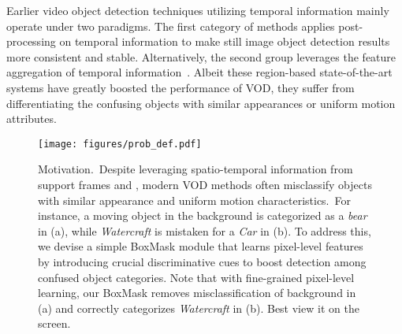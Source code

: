 \documentclass[10pt,twocolumn,letterpaper]{article}
\begin{document}
Earlier video object detection techniques utilizing temporal information mainly operate under two paradigms. The first category of methods applies post-processing on temporal information to make still image object detection results~\cite{han2016seq, kang2016object, kang2017t, belhassen2019improving} more consistent and stable. Alternatively, the second group leverages the feature aggregation of temporal information~\cite{zhu2017flow, chen2018optimizing, wu2019sequence, yao2020video, chen2020memory, gong2021temporal}. Albeit these region-based state-of-the-art systems have greatly boosted the performance of VOD, they suffer from differentiating the confusing objects with similar appearances or uniform motion attributes.  

\begin{figure*}
\begin{center}
\texttt{[image: figures/prob\_def.pdf]}
    \caption{Motivation.~Despite leveraging spatio-temporal information from support frames  and , modern VOD methods often misclassify objects with similar appearance and uniform motion characteristics.~For instance, a moving object in the {background} is categorized as a \textit{bear} in (a), while \textit{Watercraft} is mistaken for a \textit{Car} in (b). To address this, we devise a simple BoxMask module that learns pixel-level features by introducing crucial discriminative cues to boost detection among confused object categories. Note that with fine-grained pixel-level learning, our BoxMask removes misclassification of {background} in (a) and correctly categorizes \textit{Watercraft} in (b). Best view it on the screen.}
\end{center}
\label{fig:prob_def}
\vspace{-20pt}
\end{figure*}
\end{document}
